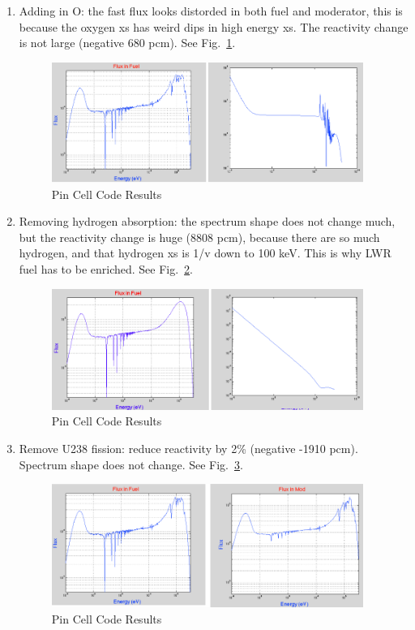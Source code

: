 \documentclass{school-22.211-notes}
\begin{document}
\begin{enumerate}
\item Adding in O: the fast flux looks distorded in both fuel and moderator, this is because the oxygen xs has weird dips in high energy xs. The reactivity change is not large (negative 680 pcm).  See Fig.~\ref{pc-4}. 
\begin{figure}[h]
  \centering
  \includegraphics[width=4in]{images/r-m/pc-4.png}
  \caption{Pin Cell Code Results} \label{pc-4}
\end{figure}


\item Removing hydrogen absorption: the spectrum shape does not change much, but the reactivity change is huge (8808 pcm), because there are so much hydrogen, and that hydrogen xs is 1/v down to 100 keV. This is why LWR fuel has to be enriched. See Fig.~\ref{pc-5}. 
\begin{figure}[h]
  \centering
  \includegraphics[width=4in]{images/r-m/pc-5.png}
  \caption{Pin Cell Code Results} \label{pc-5}
\end{figure}



\item Remove U238 fission: reduce reactivity by 2\% (negative -1910 pcm). Spectrum shape does not change. See Fig.~\ref{pc-6}. 
\begin{figure}[h]
  \centering
  \includegraphics[width=4in]{images/r-m/pc-6.png}
  \caption{Pin Cell Code Results} \label{pc-6}
\end{figure}


\end{enumerate}
\end{document}
